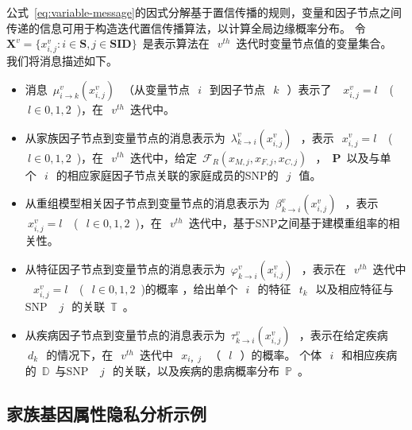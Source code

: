 公式~\ref{eq:variable-message}的因式分解基于置信传播的规则，变量和因子节点之间传递的信息可用于构造迭代置信传播算法，以计算全局边缘概率分布。 令~$\mathbf{X}^v=\{x_{i,j}^v: i\in \mathbf{S}, j \in \mathbf{SID}\}$~是表示算法在~$~v^{th}$~迭代时变量节点值的变量集合。 我们将消息描述如下。

\begin{itemize}
	\item 消息~$\mu_{i\rightarrow k}^{v}(x_{i,j}^{v})~$~（从变量节点~$~i~$~到因子节点~$~k~$~）表示了 ~$~x_{i,j}^v=l~$~ (~$~l \in {0,1,2}$~)，在~$~v^{th}$~迭代中。
	\item 从家族因子节点到变量节点的消息表示为~$\lambda_{k \rightarrow i}^v(x_{i,j}^v)~$~，表示~$~x_{i,j}^v=l~$~ (~$~l \in {0,1,2}$~)，在~$~v^{th}$~迭代中，给定~$\mathcal{F}_{R}(x_{M,j},x_{F,j}, x_{C,j})~$~，~$\mathbf{P}$~以及与单个~$~i~$~的相应家庭因子节点关联的家庭成员的SNP的~$~j~$~值。
	\item 从重组模型相关因子节点到变量节点的消息表示为~$\beta_{k \rightarrow i}^v(x_{i,j}^v)~$~，表示~$~x_{i,j}^v=l~$~ (~$~l \in {0,1,2}$~)，在~$~v^{th}$~迭代中，基于SNP之间基于建模重组率的相关性。
	\item 从特征因子节点到变量节点的消息表示为~$\varphi_{k \rightarrow i}^v(x_{i,j}^v)~$~，表示在~$~v^{th}$~迭代中 ~$~x_{i,j}^v=l~$~ (~$~l \in {0,1,2}$~)的概率 ，给出单个~$~i~$~的特征~$~t_k~$~以及相应特征与SNP ~$~j~$~的关联~$\mathbb{T}$~。
	\item 从疾病因子节点到变量节点的消息表示为~$\tau_{k \rightarrow i}^v(x_{i,j}^v)~$~，表示在给定疾病~$~d_k~$~的情况下，在~$~v^{th}$~迭代中~$~ x_ {i，j} ~$~（~$~ l ~$~）的概率。 个体~$~i~$~和相应疾病的~$\mathbb{D}$~与SNP ~$~j~$~的关联，以及疾病的患病概率分布~$\mathbb{P}$~。
	
\end{itemize}

\subsection{家族基因属性隐私分析示例}

